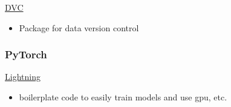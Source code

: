 \documentclass[
  letterpaper,
  DIV=11,
  numbers=noendperiod]{scrartcl}
\providecommand{\tightlist}{%
  \setlength{\itemsep}{0pt}\setlength{\parskip}{0pt}}\usepackage{longtable,booktabs,array}
\begin{document}
\href{https://dvc.org/}{DVC}

\begin{itemize}
\tightlist
\item
  Package for data version control
\end{itemize}

\subsubsection{PyTorch}\label{pytorch-1}

\href{https://lightning.ai/docs/pytorch/stable/}{Lightning}

\begin{itemize}
\tightlist
\item
  boilerplate code to easily train models and use gpu, etc.
\end{itemize}
\end{document}

